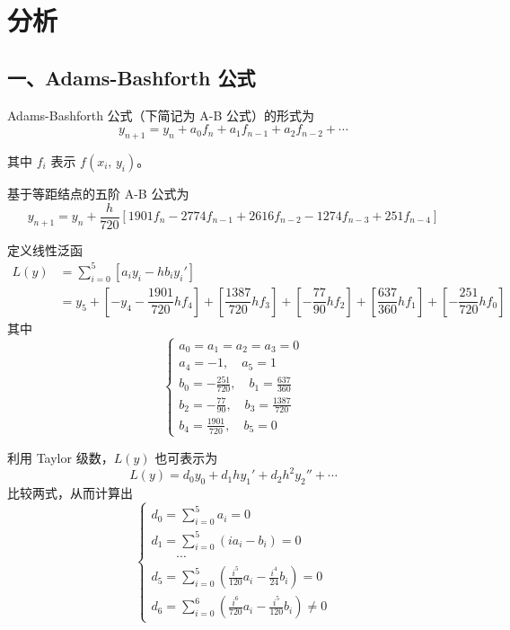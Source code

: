 \documentclass{ctexart}
\begin{document}
\section*{分析}
	\subsection*{一、Adams-Bashforth 公式}
		\noindent Adams-Bashforth 公式（下简记为 A-B 公式）的形式为
		\begin{equation}
			y_{n+1} = y_{n} + a_0 f_{n} + a_1 f_{n-1} + a_2 f_{n-2} + \cdots
		\end{equation}
		
		\noindent 其中 $f_{i}$ 表示 $f(x_i,\,y_i)$。
		
		基于等距结点的五阶 A-B 公式为
		\begin{equation}
			y_{n+1} = y_{n} + \dfrac{h}{720}\left[ 1901 f_{n} - 2774 f_{n-1} + 2616 f_{n-2} - 1274 f_{n-3} + 251f_{n-4} \right]
		\end{equation}
		
		\noindent 定义线性泛函
		\begin{align*}
			L(y) & = \sum_{i = 0}^5 \left[ a_i y_i - h b_i y_i'\right] \\
			& = y_5
			+ \left[ - y_4 - \dfrac{1901}{720} h f_4 \right]
			+ \left[ \dfrac{1387}{720} h f_3 \right]
			+ \left[ - \dfrac{77}{90} h f_2 \right]
			+ \left[ \dfrac{637}{360} h f_1 \right]
			+ \left[ - \dfrac{251}{720} h f_0 \right]
		\end{align*}
		其中
		\begin{equation}
		\begin{cases}
		\displaystyle
		a_0 = a_1 = a_2 = a_3 = 0\\
		a_4 = -1,\quad a_5 = 1 \\
		b_0 = - \frac{251}{720},\quad b_1 = \frac{637}{360} \\
		b_2 = - \frac{77}{90},\quad b_3 = \frac{1387}{720} \\
		b_4 = \frac{1901}{720},\quad b_5 = 0
		\end{cases}
		\end{equation}
		
		利用 Taylor 级数，$L(y)$ 也可表示为
		\begin{equation}
			L(y) = d_0 y_0 + d_1 h y_1' + d_2 h^2 y_2'' + \cdots
		\end{equation}
		比较两式，从而计算出
		\begin{equation}
		\begin{cases}
			\displaystyle d_0 = \sum_{i = 0}^5 a_i = 0 \\
			\displaystyle d_1 = \sum_{i = 0}^5 (i a_i - b_i) = 0 \\
			\qquad \cdots\\
			\displaystyle d_5 = \sum_{i = 0}^5 \left(\frac{i^5}{120} a_i - \frac{i^4}{24} b_i \right) = 0 \\
			\displaystyle d_6 = \sum_{i = 0}^6 \left(\frac{i^6}{720} a_i - \frac{i^5}{120} b_i \right) \neq 0
		\end{cases}
		\end{equation}
		
\end{document}
